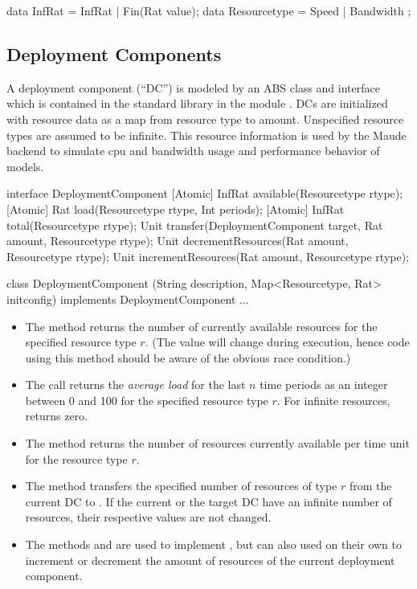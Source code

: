 \begin{absexample} 
data InfRat = InfRat | Fin(Rat value);
data Resourcetype = Speed | Bandwidth ;
\end{absexample} 

\subsection{Deployment Components}

A deployment component (``DC'') is modeled by an ABS class and interface
 which is contained in the standard library in
the module .  DCs are initialized with resource data as a
map from resource type to amount.  Unspecified resource types are assumed to
be infinite.  This resource information is used by the Maude backend to
simulate cpu and bandwidth usage and performance behavior of models.

\begin{absexample} 
interface DeploymentComponent {
    [Atomic] InfRat available(Resourcetype rtype);
    [Atomic] Rat load(Resourcetype rtype, Int periods);
    [Atomic] InfRat total(Resourcetype rtype);
    Unit transfer(DeploymentComponent target, Rat amount, Resourcetype rtype);
    Unit decrementResources(Rat amount, Resourcetype rtype);
    Unit incrementResources(Rat amount, Resourcetype rtype);
}

class DeploymentComponent (String description,
                           Map<Resourcetype, Rat> initconfig)
implements DeploymentComponent {
    ...
}
\end{absexample} 

\begin{itemize}
\item The method  returns the number of currently
  available resources for the specified resource type $r$.  (The value will
  change during execution, hence code using this method should be aware of the
  obvious race condition.)
\item The call  returns the \emph{average load} for the
  last $n$ time periods as an integer between 0 and 100 for the specified
  resource type $r$.  For infinite resources,  returns zero.
\item The method  returns the number of resources currently
  available per time unit for the resource type $r$.
\item The method  transfers the
  specified number of resources of type $r$ from the current DC to
  .  If the current or the target DC have an infinite number
  of resources, their respective values are not changed.
\item The methods  and
   are used to implement ,
  but can also used on their own to increment or decrement the amount of
  resources of the current deployment component.
\end{itemize}

